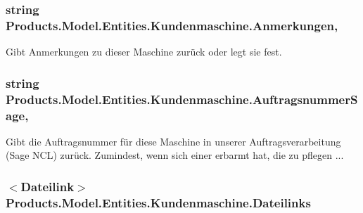 \subsubsection[{\texorpdfstring{Anmerkungen}{Anmerkungen}}]{\setlength{\rightskip}{0pt plus 5cm}string Products.\+Model.\+Entities.\+Kundenmaschine.\+Anmerkungen\hspace{0.3cm}{\ttfamily [get]}, {\ttfamily [set]}}\hypertarget{class_products_1_1_model_1_1_entities_1_1_kundenmaschine_ab46136495c9908ce64153e33c261f756}{}\label{class_products_1_1_model_1_1_entities_1_1_kundenmaschine_ab46136495c9908ce64153e33c261f756}


Gibt Anmerkungen zu dieser Maschine zurück oder legt sie fest. 

\subsubsection[{\texorpdfstring{Auftragsnummer\+Sage}{AuftragsnummerSage}}]{\setlength{\rightskip}{0pt plus 5cm}string Products.\+Model.\+Entities.\+Kundenmaschine.\+Auftragsnummer\+Sage\hspace{0.3cm}{\ttfamily [get]}, {\ttfamily [set]}}\hypertarget{class_products_1_1_model_1_1_entities_1_1_kundenmaschine_a551de60b37649f3d48e37befc3b57d84}{}\label{class_products_1_1_model_1_1_entities_1_1_kundenmaschine_a551de60b37649f3d48e37befc3b57d84}


Gibt die Auftragsnummer für diese Maschine in unserer Auftragsverarbeitung (Sage N\+CL) zurück. Zumindest, wenn sich einer erbarmt hat, die zu pflegen ... 

\subsubsection[{\texorpdfstring{Dateilinks}{Dateilinks}}]{$<${\bf Dateilink}$>$ Products.\+Model.\+Entities.\+Kundenmaschine.\+Dateilinks\hspace{0.3cm}{\ttfamily [get]}}\hypertarget{class_products_1_1_model_1_1_entities_1_1_kundenmaschine_ae92c4fda35705dd9463fb8a61ac6e3ce}{}\label{class_products_1_1_model_1_1_entities_1_1_kundenmaschine_ae92c4fda35705dd9463fb8a61ac6e3ce}


